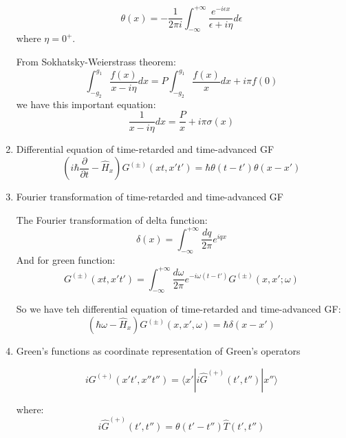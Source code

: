 \documentclass[12pt]{article}
\numberwithin{equation}{section}
\begin{document}
\begin{enumerate}
	\begin{equation}
		\theta (x)=-\frac{1}{2\pi i}\int_{-\infty}^{+\infty}\frac{e^{-i\epsilon x}}{\epsilon+i \eta}d\epsilon
	\end{equation}	
	where $\eta=0^{+}$. \par
	From Sokhatsky-Weierstrass theorem:
	\begin{equation}
		\int^{g_1}_{-g_2}\frac{f(x)}{x-i \eta}dx=P\int^{g_1}_{-g_2}\frac{f(x)}{x}dx+i\pi f(0)
	\end{equation}	
	we have this important equation:
	\begin{equation}
		\frac{1}{x-i \eta}dx=\frac{P}{x}+i\pi \sigma(x)
	\end{equation}		
\item Differential equation of time-retarded and time-advanced GF
	\begin{equation}
		(i\hbar \frac{\partial}{\partial t}-\hat{H}_x)G^{(\pm)}(xt,x't')=\hbar \theta(t-t')\theta(x-x')
	\end{equation}		
\item Fourier transformation of time-retarded and time-advanced GF \par
	The Fourier transformation of delta function:
	\begin{equation}
		\delta(x)=\int_{-\infty}^{+\infty}\frac{dq}{2\pi}e^{iqx}
	\end{equation}	
	And for green function:
	\begin{equation}
		G^{(\pm)}(xt,x't')=\int_{-\infty}^{+\infty}\frac{d\omega}{2\pi}e^{-i\omega(t-t')}G^{(\pm)}(x,x';\omega)
	\end{equation}	\par
	So we have teh differential equation of time-retarded and time-advanced GF:
	\begin{equation}
		(\hbar \omega-\hat{H}_x)G^{(\pm)}(x,x',\omega)=\hbar \delta(x-x')
	\end{equation}	\par	
\item Green's functions as coordinate representation of Green's operators\par
	\begin{equation}
		iG^{(+)}(x't',x''t'')=\langle x'|i\hat{G}^{(+)}(t',t'')|x''\rangle
	\end{equation}	\par
	where:
	\begin{equation}
		i\hat{G}^{(+)}(t',t'')=\theta(t'-t'')\hat{T}(t',t'')
	\end{equation}	\par

\end{enumerate}
\end{document}
